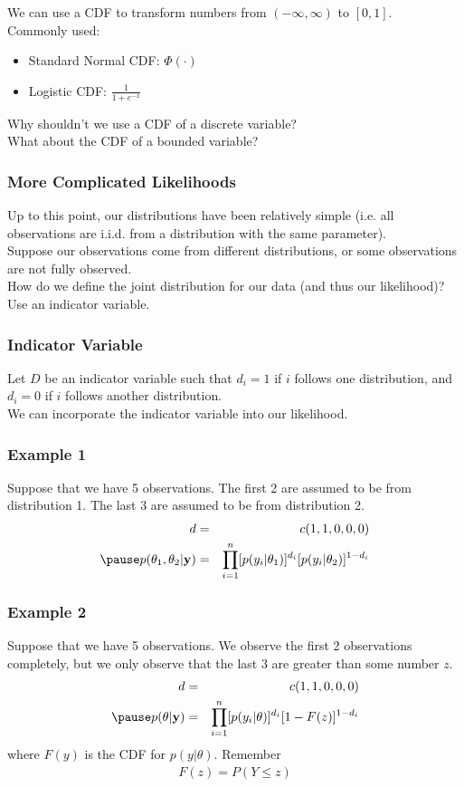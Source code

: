 \documentclass[handout]{beamer}
\begin{document}
\begin{frame}
We can use a CDF to transform numbers from $(-\infty, \infty)$ to $[0,1]$.\\
\bigskip
\pause
Commonly used: 
\pause
\begin{itemize}
\item Standard Normal CDF: $\Phi(\cdot)$\\
\pause
\item Logistic CDF: $\frac{1}{1 + e^{-x}}$
\end{itemize}
\pause
\bigskip
\bigskip
Why shouldn't we use a CDF of a discrete variable?\\
\pause
\bigskip
What about the CDF of a bounded variable?
\end{frame}

\begin{frame}
\frametitle{More Complicated Likelihoods}
\pause
Up to this point, our distributions have been relatively simple
(i.e. all observations are i.i.d. from a distribution with the same parameter).\\
\pause
\bigskip
Suppose our observations come from different distributions, or some
observations are not fully observed.  \\
\pause
\bigskip
How do we define the joint distribution for our data (and thus our likelihood)?\\
\pause
\bigskip
Use an indicator variable.
\end{frame}

\begin{frame}
\frametitle{Indicator Variable}
Let $D$ be an indicator variable such that $d_i = 1$ if $i$ follows
one distribution, and $d_i = 0$ if $i$ follows another distribution.\\
\pause
\bigskip
We can incorporate the indicator variable into our likelihood.
\end{frame}

\begin{frame}
\frametitle{Example 1}
\pause
Suppose that we have 5 observations.  The first 2 are assumed to be
from distribution 1.  The last 3 are assumed to be from distribution 2.
\pause
\bigskip
\begin{eqnarray*}
d &=& c(1,1,0,0,0)\\
\pause
p(\theta_1, \theta_2 | \mathbf{y}) &=& \prod_{i=1}^n [p(y_i |
\theta_1)]^{d_i} [p(y_i | \theta_2)]^{1-d_i}
\end{eqnarray*}
\end{frame}

\begin{frame}
\frametitle{Example 2}
\pause
Suppose that we have 5 observations.  We observe the first 2
observations completely, but we only observe that the last 3 are greater
than some number $z$. 
\pause
\bigskip
\begin{eqnarray*}
d &=& c(1,1,0,0,0)\\
\pause
p(\theta | \mathbf{y}) &=& \prod_{i=1}^n [p(y_i |
\theta)]^{d_i} [1 - F(z)]^{1-d_i}
\end{eqnarray*}
where $F(y)$ is the CDF for $p(y | \theta)$. \pause Remember
\begin{eqnarray*}
F(z) = P(Y \le z)
\end{eqnarray*}
\end{frame}
\end{document}
